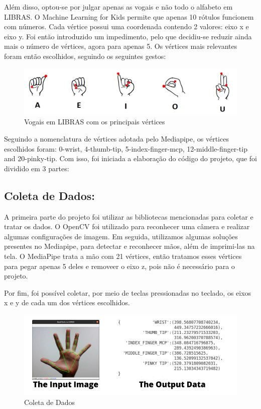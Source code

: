 \documentclass[a4paper, 12pt]{article}
\begin{document}
Além disso, optou-se por julgar apenas as vogais e não todo o alfabeto em LIBRAS. O Machine Learning for Kids permite que apenas 10 rótulos funcionem com números. Cada vértice possui uma coordenada contendo 2 valores: eixo x e eixo y. Foi então introduzido um impedimento, pelo que decidiu-se reduzir ainda mais o número de vértices, agora para apenas 5. Os vértices mais relevantes foram então escolhidos, seguindo os seguintes gestos:
 
 
 \begin{figure}[!ht]
\centering
\includegraphics[scale=0.3]{img/hands_gestures.png}
\caption{Vogais em LIBRAS com os principais vértices}
\label{figure_4}
\end{figure}
 
Seguindo a nomenclatura de vértices adotada pelo Mediapipe, os vértices escolhidos foram: 0-wrist, 4-thumb-tip, 5-index-finger-mcp, 12-middle-finger-tip and 20-pinky-tip. Com isso, foi iniciada a elaboração do código do projeto, que foi dividido em 3 partes:



\subsection{Coleta de Dados:}
A primeira parte do projeto foi utilizar as bibliotecas mencionadas para coletar e tratar os dados. O OpenCV foi utilizado para reconhecer uma câmera e realizar algumas configurações de imagem. Em seguida, utilizamos algumas soluções presentes no Mediapipe, para detectar e reconhecer mãos, além de imprimi-las na tela. O MediaPipe trata a mão com 21 vértices, então tratamos esses vértices para pegar apenas 5 deles e removeer o eixo z, pois não é necessário para o projeto.

Por fim, foi possível coletar, por meio de teclas pressionadas no teclado, os eixos x e y de cada um dos vértices escolhidos.

 \begin{figure}[!ht]
\centering
\includegraphics[scale=0.65]{img/data_collect.png}
\caption{Coleta de Dados}
\label{figure_5}
\end{figure}
\end{document}
